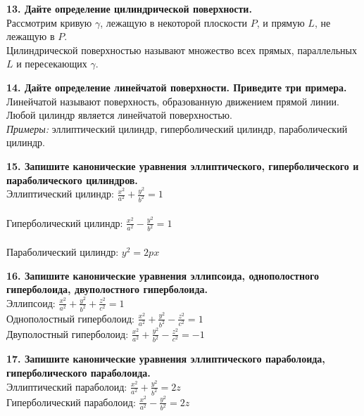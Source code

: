 \documentclass[11pt,a4paper]{article}
\begin{document}
\textbf{13. Дайте определение цилиндрической поверхности.\\}
Рассмотрим кривую $\gamma$, лежащую в некоторой плоскости $P$, и прямую $L$, не лежащую в $P$.
\\
Цилиндрической поверхностью называют множество всех прямых, параллельных $L$ и пересекающих $\gamma$.

\textbf{14. Дайте определение линейчатой поверхности. Приведите три примера.\\}
Линейчатой называют поверхность, образованную движением прямой линии.
\\
Любой цилиндр является линейчатой поверхностью.
\\
\textit{Примеры:} эллиптический цилиндр, гиперболический цилиндр, параболический цилиндр.

\textbf{15. Запишите канонические уравнения эллиптического, гиперболического и параболического цилиндров.\\}
Эллиптический цилиндр: $\frac{x^2}{a^2} + \frac{y^2}{b^2} = 1$
\\
\\
Гиперболический цилиндр: $\frac{x^2}{a^2} - \frac{y^2}{b^2} = 1$
\\
\\
Параболический цилиндр: $y^2 = 2px$

\textbf{16. Запишите канонические уравнения эллипсоида, однополостного гиперболоида, двуполостного гиперболоида.\\}
Эллипсоид: $\frac{x^2}{a^2} + \frac{y^2}{b^2} + \frac{z^2}{c^2} = 1$
\\
Однополостный гиперболоид: $\frac{x^2}{a^2} + \frac{y^2}{b^2} - \frac{z^2}{c^2} = 1$
\\
Двуполостный гиперболоид: $\frac{x^2}{a^2} + \frac{y^2}{b^2} - \frac{z^2}{c^2} = -1$

\textbf{17. Запишите канонические уравнения эллиптического параболоида, гиперболического параболоида.\\}
Эллиптический параболоид: $\frac{x^2}{a^2} + \frac{y^2}{b^2} = 2z$
\\
Гиперболический параболоид: $\frac{x^2}{a^2} - \frac{y^2}{b^2} = 2z$
\end{document}
